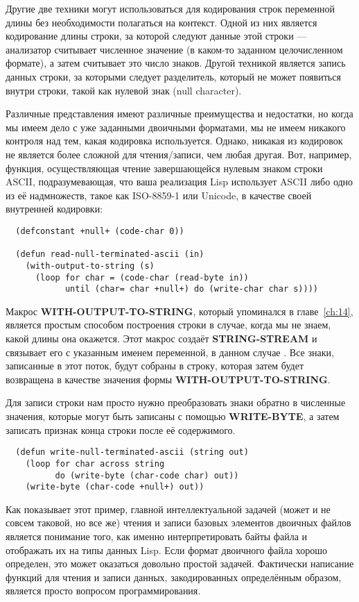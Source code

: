 Другие две техники могут использоваться для кодирования строк переменной длины без
необходимости полагаться на контекст. Одной из них является кодирование длины строки, за
которой следуют данные этой строки --- анализатор считывает численное значение (в каком-то
заданном целочисленном формате), а затем считывает это число знаков. Другой техникой
является запись данных строки, за которыми следует разделитель, который не может появиться
внутри строки, такой как нулевой знак (null character).

Различные представления имеют различные преимущества и недостатки, но когда мы имеем дело
с уже заданными двоичными форматами, мы не имеем никакого контроля над тем, какая
кодировка используется. Однако, никакая из кодировок не является более сложной для
чтения/записи, чем любая другая. Вот, например, функция, осуществляющая чтение
завершающейся нулевым знаком строки ASCII, подразумевающая, что ваша реализация Lisp
использует ASCII либо одно из её надмножеств, такое как ISO-8859-1 или Unicode, в качестве
своей внутренней кодировки:

\begin{lstlisting}
  (defconstant +null+ (code-char 0))

  (defun read-null-terminated-ascii (in)
    (with-output-to-string (s)
      (loop for char = (code-char (read-byte in))
            until (char= char +null+) do (write-char char s))))
\end{lstlisting}

Макрос \textbf{WITH-OUTPUT-TO-STRING}, который упоминался в главе~\ref{ch:14}, является
простым способом построения строки в случае, когда мы не знаем, какой длины она
окажется. Этот макрос создаёт \textbf{STRING-STREAM} и связывает его с указанным именем
переменной, в данном случае . Все знаки, записанные в этот поток, будут собраны в
строку, которая затем будет возвращена в качестве значения формы
\textbf{WITH-OUTPUT-TO-STRING}.

Для записи строки нам просто нужно преобразовать знаки обратно в численные значения,
которые могут быть записаны с помощью \textbf{WRITE-BYTE}, а затем записать признак конца
строки после её содержимого.

\begin{lstlisting}
  (defun write-null-terminated-ascii (string out)
    (loop for char across string
          do (write-byte (char-code char) out))
    (write-byte (char-code +null+) out))
\end{lstlisting}

Как показывает этот пример, главной интеллектуальной задачей (может и не совсем таковой,
но все же) чтения и записи базовых элементов двоичных файлов является понимание того, как
именно интерпретировать байты файла и отображать их на типы данных Lisp. Если формат
двоичного файла хорошо определен, это может оказаться довольно простой задачей. Фактически
написание функций для чтения и записи данных, закодированных определённым образом,
является просто вопросом программирования.

